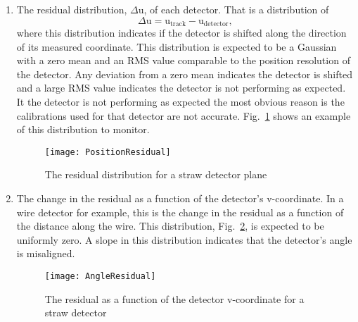\begin{enumerate}[label=\roman*)]
\item The residual distribution, $\Delta$u, of each detector.  That is a
  distribution of
  \begin{equation}
    \Delta \mathrm{u} =
    \mathrm{u}_{\mathrm{track}} - \mathrm{u}_{\mathrm{detector}},
  \end{equation}
  where this distribution indicates if the detector is shifted along the
  direction of its measured coordinate.  This distribution is expected to be a
  Gaussian with a zero mean and an RMS value comparable to the position
  resolution of the detector.  Any deviation from a zero mean indicates the
  detector is shifted and a large RMS value indicates the detector is not
  performing as expected.  It the detector is not performing as expected the
  most obvious reason is the calibrations used for that detector are not
  accurate.  Fig.~\ref{fig::PositionResidual} shows an example of this
  distribution to monitor.
  \begin{figure}[h!t]
  \centering \texttt{[image: PositionResidual]}
  \caption{The residual distribution for a straw detector plane}
  \label{fig::PositionResidual}
  
\end{figure}
\item The change in the residual as a function of the detector's v-coordinate.
  In a wire detector for example, this is the change in the residual as a
  function of the distance along the wire.  This distribution,
  Fig.~\ref{fig::AngleResidual}, is expected to be uniformly zero.  A slope in
  this distribution indicates that the detector's angle is misaligned.
  \begin{figure}[h!t]
    \centering \texttt{[image: AngleResidual]}
    \caption{The residual as a function of the detector v-coordinate for a straw
      detector}
    \label{fig::AngleResidual}
  \end{figure}
  

\end{enumerate}
